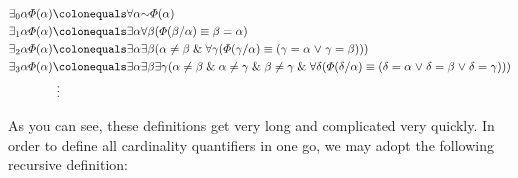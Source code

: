 \vspace{-.2in}
\begin{align*}
  \qt{\exists_0}{\alpha}\metaA(\alpha) &\colonequals \qt{\forall}{\alpha}\enot\metaA(\alpha)\\
  \qt{\exists_1}{\alpha}\metaA(\alpha) &\colonequals \qt{\exists}{\alpha}\qt{\forall}{\beta}(\metaA(\beta/\alpha) \eiff \beta = \alpha)\\ 
  \qt{\exists_2}{\alpha}\metaA(\alpha) &\colonequals \qt{\exists}{\alpha}\qt{\exists}{\beta}(\alpha\neq\beta \eand \qt{\forall}{\gamma}(\metaA(\gamma/\alpha) \eiff (\gamma = \alpha \eor \gamma = \beta)))\\
  \qt{\exists_3}{\alpha}\metaA(\alpha) &\colonequals \qt{\exists}{\alpha}
      \qt{\exists}{\beta}
        \qt{\exists}{\gamma}(
          \alpha\neq\beta \eand \alpha\neq\gamma \eand \beta\neq\gamma \eand \qt{\forall}{\delta}(
            \metaA(\delta/\alpha) \eiff (
              \delta = \alpha \eor \delta = \beta \eor \delta = \gamma
            )
          )
        )\\
  & ~\vdots
\end{align*}

As you can see, these definitions get very long and complicated very quickly.
In order to define all cardinality quantifiers in one go, we may adopt the following recursive definition:

